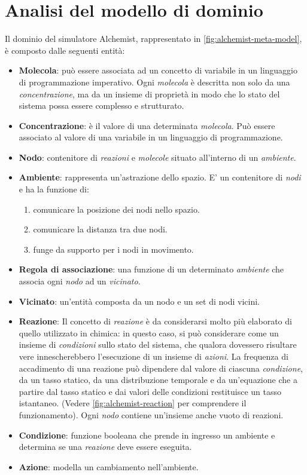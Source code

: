 \documentclass[12pt,a4paper,openright,oneside]{book}
\begin{document}
\section{Analisi del modello di dominio}
Il dominio del simulatore Alchemist, rappresentato in \cref{fig:alchemist-meta-model}, è composto dalle seguenti entità:
\begin{itemize}
    \item \textbf{Molecola}: può essere associata ad un concetto di variabile in un linguaggio di programmazione imperativo. Ogni \textit{molecola} è descritta non solo da una \textit{concentrazione}, ma da un insieme di proprietà in modo che lo stato del sistema possa essere complesso e strutturato.
    \item \textbf{Concentrazione}: è il valore di una determinata \textit{molecola}. Può essere associato al valore di una variabile in un linguaggio di programmazione.
    \item \textbf{Nodo}: contenitore di \textit{reazioni} e \textit{molecole} situato all'interno di un \textit{ambiente}.
    \item \textbf{Ambiente}: rappresenta  un'astrazione dello spazio. E' un contenitore di \textit{nodi} e ha la funzione di:
    \begin{enumerate}
        \item comunicare la posizione dei nodi nello spazio.
        \item comunicare la distanza tra due nodi.
        \item funge da supporto per i nodi in movimento.
    \end{enumerate}
    \item \textbf{Regola di associazione}: una funzione di un determinato \textit{ambiente} che associa ogni \textit{nodo} ad un \textit{vicinato}.
    \item \textbf{Vicinato}: un'entità composta da un nodo e un set di nodi vicini.
    \item \textbf{Reazione}: Il concetto di \textit{reazione} è da considerarsi molto più elaborato di quello utilizzato in chimica: in questo caso, si può considerare come un insieme di \textit{condizioni} sullo stato del sistema, che qualora dovessero risultare vere innescherebbero l’esecuzione di un insieme di \textit{azioni}. La frequenza di accadimento di una reazione può dipendere dal valore di ciascuna \textit{condizione}, da un tasso statico, da una distribuzione temporale e da un'equazione che a partire dal tasso statico e dai valori delle condizioni restituisce un tasso istantaneo. (Vedere \cref{fig:alchemist-reaction} per comprendere il funzionamento). Ogni \textit{nodo} contiene un'insieme anche vuoto di reazioni. 
    \item \textbf{Condizione}: funzione booleana che prende in ingresso un ambiente e determina se una \textit{reazione} deve essere eseguita.
    \item \textbf{Azione}: modella un cambiamento nell'ambiente.
\end{itemize}
\end{document}
